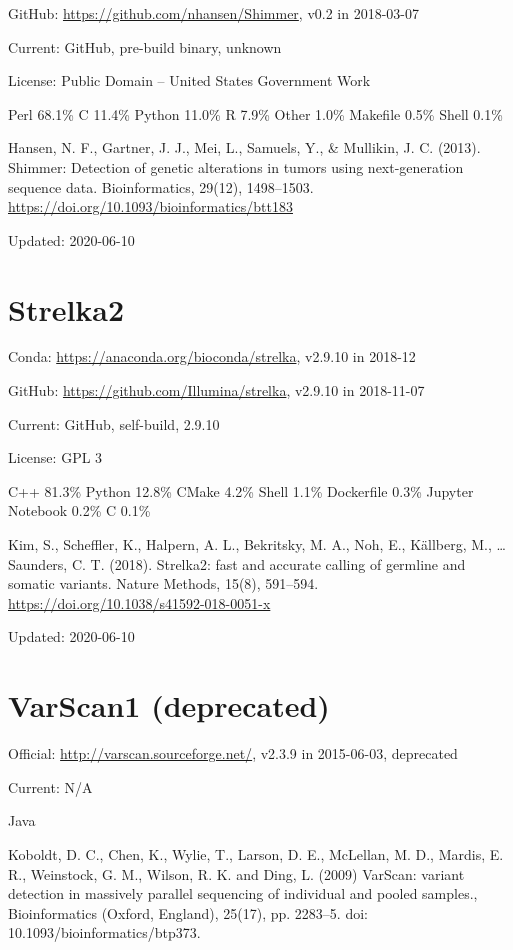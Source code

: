 \documentclass[]{article}
\begin{document}
GitHub: \url{https://github.com/nhansen/Shimmer}, v0.2 in 2018-03-07

Current: GitHub, pre-build binary, unknown

License: Public Domain -- United States Government Work

Perl 68.1\% C 11.4\% Python 11.0\% R 7.9\% Other 1.0\% Makefile 0.5\% Shell 0.1\%

Hansen, N. F., Gartner, J. J., Mei, L., Samuels, Y., \& Mullikin, J. C. (2013). Shimmer: Detection of genetic alterations in tumors using next-generation sequence data. Bioinformatics, 29(12), 1498–1503. \url{https://doi.org/10.1093/bioinformatics/btt183}

Updated: 2020-06-10

\section{Strelka2}

Conda: \url{https://anaconda.org/bioconda/strelka}, v2.9.10 in 2018-12

GitHub: \url{https://github.com/Illumina/strelka}, v2.9.10 in 2018-11-07

Current: GitHub, self-build, 2.9.10

License: GPL 3

C++ 81.3\% Python 12.8\% CMake 4.2\% Shell 1.1\% Dockerfile 0.3\% Jupyter Notebook 0.2\% C 0.1\%

Kim, S., Scheffler, K., Halpern, A. L., Bekritsky, M. A., Noh, E., Källberg, M., … Saunders, C. T. (2018). Strelka2: fast and accurate calling of germline and somatic variants. Nature Methods, 15(8), 591–594. \url{https://doi.org/10.1038/s41592-018-0051-x}

Updated: 2020-06-10
\section{VarScan1 (deprecated)}

Official: \url{http://varscan.sourceforge.net/}, v2.3.9 in 2015-06-03, deprecated

Current: N/A

Java

Koboldt, D. C., Chen, K., Wylie, T., Larson, D. E., McLellan, M. D., Mardis, E. R., Weinstock, G. M., Wilson, R. K. and Ding, L. (2009) VarScan: variant detection in massively parallel sequencing of individual and pooled samples., Bioinformatics (Oxford, England), 25(17), pp. 2283–5. doi: 10.1093/bioinformatics/btp373.
\end{document}
